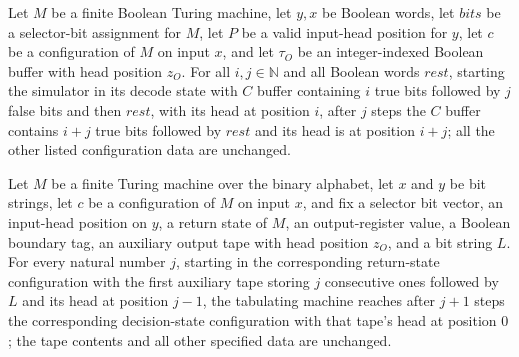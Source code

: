 \begin{theorem}
\label{Complexity.Meyer.dec_sweep}
\leanok
{}
Let $M$ be a finite Boolean Turing machine, let $y,x$ be Boolean words, let $bits$ be a
selector-bit assignment for $M$, let $P$ be a valid input-head position for $y$, let $c$
be a configuration of $M$ on input $x$, and let $\tau_O$ be an integer-indexed Boolean
buffer with head position $z_O$. For all $i,j\in\mathbb{N}$ and all Boolean words
$rest$, starting the simulator in its decode state with $C$ buffer containing $i$ true
bits followed by $j$ false bits and then $rest$, with its head at position $i$, after
$j$ steps the $C$ buffer contains $i+j$ true bits followed by $rest$ and its head is at
position $i+j$; all the other listed configuration data are unchanged.
\end{theorem}

\begin{theorem}
\label{Complexity.Meyer.ret_sweep}
\leanok
{}
Let $M$ be a finite Turing machine over the binary alphabet, let $x$ and $y$ be bit
strings, let $c$ be a configuration of $M$ on input $x$, and fix a selector bit vector,
an input-head position on $y$, a return state of $M$, an output-register value, a
Boolean boundary tag, an auxiliary output tape with head position $z_O$, and a bit
string $L$. For every natural number $j$, starting in the corresponding return-state
configuration with the first auxiliary tape storing $j$ consecutive ones followed by $L$
and its head at position $j-1$, the tabulating machine reaches after $j+1$ steps the
corresponding decision-state configuration with that tape's head at position $0$; the
tape contents and all other specified data are unchanged.
\end{theorem}

